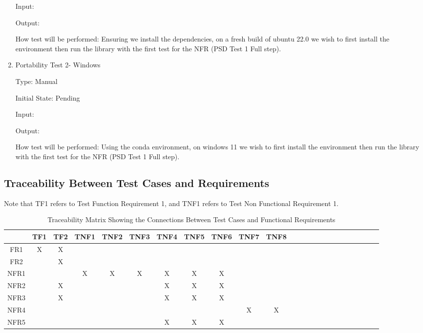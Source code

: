 \documentclass[12pt, titlepage]{article}
\begin{document}
\begin{enumerate}
Input: 
					
Output: 
					
How test will be performed: Ensuring we install the dependencies, on a fresh build of ubuntu 22.0
we wish to first install the environment then run the library with the first test for the 
NFR (PSD Test 1 Full step).

\item{Portability Test 2- Windows\\}

Type: Manual 
					
Initial State: Pending
					
Input: 
					
Output: 
					
How test will be performed: Using the conda environment, on windows 11
we wish to first install the environment then run the library with the first test for the 
NFR (PSD Test 1 Full step).

\end{enumerate}

\subsection{Traceability Between Test Cases and Requirements}
Note that TF1 refers to Test Function Requirement 1, and TNF1 refers to Test Non Functional Requirement 1.
\begin{table}[h!]
  \centering
  \begin{tabular}{|c|c|c|c|c|c|c|c|c|c|c|c|c|c|c|c|c|c|c|c|c|c|c|c|}
  \hline        
    & TF1& TF2 & TNF1 & TNF2& TNF3 & TNF4 & TNF5  & TNF6  & TNF7  & TNF8 \\
  \hline
  FR1                    &X &X & & & & & & & & \\ \hline
  FR2        & & X & & & & & & & & \\ \hline
  NFR1      & & &X &X &X &X &X &X & &  \\ \hline
  NFR2 & & X & & & & X & X & X & &  \\ \hline
  NFR3  & & X & & & & X & X & X & &  \\ \hline
  NFR4    & & & & & & & & & X & X \\ \hline
  NFR5     & & & & & & X & X & X & &  \\ \hline
  
  \end{tabular}
  \caption{Traceability Matrix Showing the Connections Between Test Cases and Functional Requirements}
  \label{Table:trace}
  \end{table}
\end{document}
